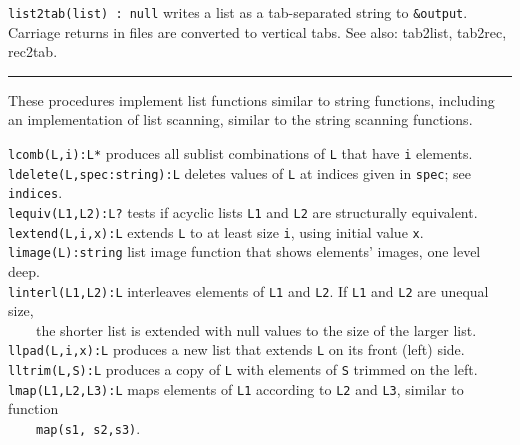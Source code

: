 \texttt{list2tab(list) : null} writes a list as a tab-separated string
to \texttt{\&output}. Carriage returns in files are converted to
vertical tabs.
See also: tab2list, tab2rec, rec2tab. 

\vspace{0.25cm}\hrule{}

These procedures implement list functions
similar to string functions, including an implementation of
list scanning, similar to the
string scanning functions.

\texttt{lcomb(L,i):L*} produces all sublist combinations of \texttt{L}
that have \texttt{i} elements.\\
\texttt{ldelete(L,spec:string):L} deletes values of \texttt{L} at
indices given in \texttt{spec}; see \texttt{indices}.\\
\texttt{lequiv(L1,L2):L?} tests if acyclic lists \texttt{L1} and \texttt{L2} are
structurally equivalent.\\
\texttt{lextend(L,i,x):L} extends \texttt{L} to at least size
\texttt{i}, using initial value \texttt{x}.\\
\texttt{limage(L):string} list image function that shows
elements' images, one level deep.\\
\texttt{linterl(L1,L2):L} interleaves elements of \texttt{L1} and
\texttt{L2}. If \texttt{L1} and \texttt{L2} are unequal size,\\
 \ \ \ \ the shorter list is extended with null values to the
size of the larger list.\\
\texttt{llpad(L,i,x):L} produces a new list that extends \texttt{L} on
its front (left) side.\\
\texttt{lltrim(L,S):L} produces a copy of \texttt{L} with elements of
\texttt{S} trimmed on the left.\\
\texttt{lmap(L1,L2,L3):L} maps elements of \texttt{L1} according to
\texttt{L2} and \texttt{L3}, similar to function\\
 \ \ \ \ \texttt{map(s1, s2,s3)}.
